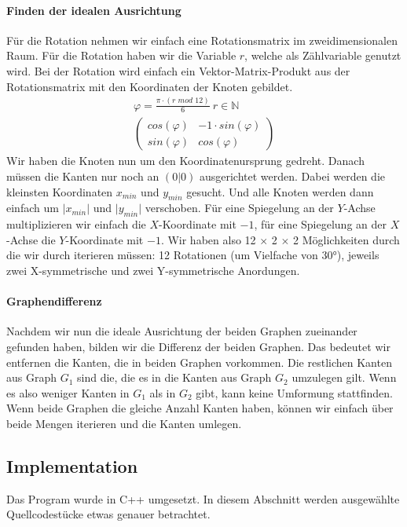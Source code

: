 \documentclass[12pt]{article}
\begin{document}
\paragraph*{Finden der idealen Ausrichtung}
Für die Rotation nehmen wir einfach eine Rotationsmatrix im zweidimensionalen Raum. Für die Rotation haben wir die Variable $ r $, welche als Zählvariable genutzt wird. Bei der Rotation wird einfach ein Vektor-Matrix-Produkt aus der Rotationsmatrix mit den Koordinaten der Knoten gebildet.
\begin{align*}
	\varphi = \frac{\pi \cdot (r \textit{ mod } 12)}{6} \ r \in \mathbb{N}\\
	\begin{pmatrix}
		cos(\varphi) & -1 \cdot sin(\varphi)\\
		sin(\varphi) & cos(\varphi)
	\end{pmatrix}
\end{align*}
Wir haben die Knoten nun um den Koordinatenursprung gedreht. Danach müssen die Kanten nur noch an $(0\vert0)$ ausgerichtet werden. Dabei werden die kleinsten Koordinaten $ x_{min} $ und $ y_{min} $ gesucht. Und alle Knoten werden dann einfach um $ \vert x_{min} \vert $ und $ \vert y_{min} \vert $ verschoben. Für eine Spiegelung an der $Y$-Achse multiplizieren wir einfach die $X$-Koordinate mit $ -1 $, für eine Spiegelung an der $X$-Achse die $Y$-Koordinate mit $ -1 $. Wir haben also 12 $ \times $ 2 $ \times $ 2 Möglichkeiten durch die wir durch iterieren müssen: 12 Rotationen (um Vielfache von 30°), jeweils zwei X-symmetrische und zwei Y-symmetrische Anordungen. \\

\paragraph*{Graphendifferenz} Nachdem wir nun die ideale Ausrichtung der beiden Graphen zueinander gefunden haben, bilden wir die Differenz der beiden Graphen. Das bedeutet wir entfernen die Kanten, die in beiden Graphen vorkommen. Die restlichen Kanten aus Graph $ G_1 $ sind die, die es in die Kanten aus Graph $ G_2 $ umzulegen gilt. Wenn es also weniger Kanten in $ G_1 $ als in $ G_2 $ gibt, kann keine Umformung stattfinden. Wenn beide Graphen die gleiche Anzahl Kanten haben, können wir einfach über beide Mengen iterieren und die Kanten umlegen.

\newpage
\subsection*{Implementation}
Das Program wurde in C++ umgesetzt. In diesem Abschnitt werden ausgewählte Quellcodestücke  etwas genauer betrachtet.
\end{document}
